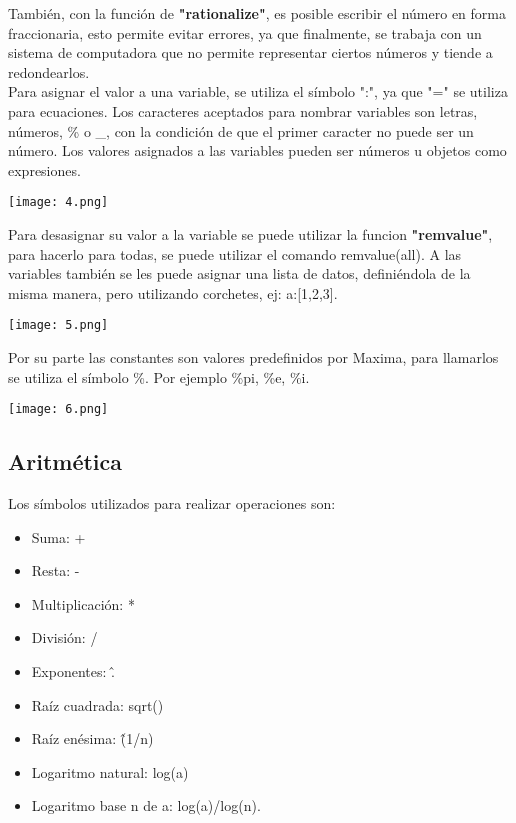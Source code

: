 \documentclass[12pt]{article}
\begin{document}
También, con la función de \textbf{"rationalize"}, es posible escribir el número en forma fraccionaria, esto permite evitar errores, ya que finalmente, se trabaja con un sistema de computadora que no permite representar ciertos números y tiende a redondearlos. \\

Para asignar el valor a una variable, se utiliza el símbolo ":", ya que "=" se utiliza para ecuaciones. Los caracteres aceptados para nombrar variables son letras, números, \% o \_, con la condición de que el primer caracter no puede ser un número. Los valores asignados a las variables pueden ser números u objetos como expresiones. \\

\begin{center}
 \texttt{[image: 4.png]}
 \end{center}

Para desasignar su valor a la variable se puede utilizar la funcion \textbf{"remvalue"}, para hacerlo para todas, se puede utilizar el comando remvalue(all). A las variables también se les puede asignar una lista de datos, definiéndola de la misma manera, pero utilizando corchetes, ej: a:[1,2,3].\\

\begin{center}
 \texttt{[image: 5.png]}
 \end{center}

Por su parte las constantes son valores predefinidos por Maxima, para llamarlos se utiliza el símbolo \%. Por ejemplo \%pi, \%e, \%i. 

\begin{center}
 \texttt{[image: 6.png]}
 \end{center}

\subsection{Aritmética}

Los símbolos utilizados para realizar operaciones son: 
\begin{itemize}
\item Suma: +
\item Resta: -
\item Multiplicación: *
\item División: /
\item Exponentes: \^. 
\item Raíz cuadrada: sqrt()
\item Raíz enésima: \^(1/n)
\item Logaritmo natural: log(a)
\item Logaritmo base n de a: log(a)/log(n).
\end{itemize}
\end{document}
